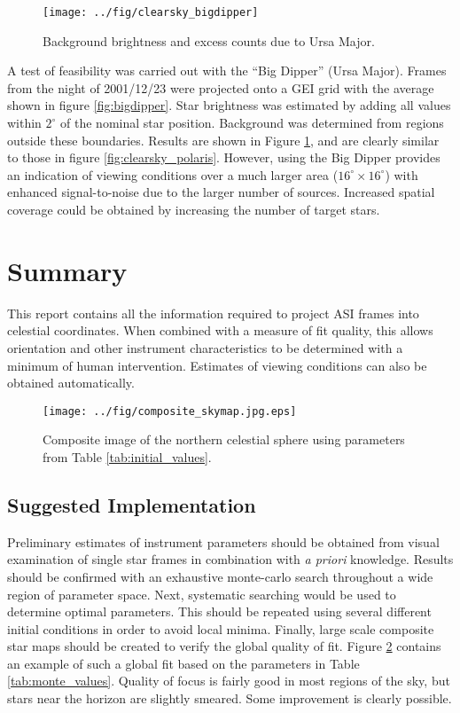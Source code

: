 \documentclass[11pt,twoside]{article}   %
\begin{document}
\begin{figure}[htb!]
  \texttt{[image: ../fig/clearsky\_bigdipper]}
    \caption[Clear sky estimates using Ursa Major]
   {Background brightness and excess counts due to
   Ursa Major.
     \label{fig:clearsky_bigdipper}  }
\end{figure}

A test of feasibility was carried out with the ``Big Dipper''
(Ursa Major). Frames from the night of 2001/12/23 were projected
onto a GEI grid with the average shown in figure
\ref{fig:bigdipper}. Star brightness was estimated by adding all
values within $2^\circ$ of the nominal star position. Background
was determined from regions outside these boundaries. Results are
shown in Figure \ref{fig:clearsky_bigdipper}, and are clearly
similar to those in figure \ref{fig:clearsky_polaris}. However,
using the Big Dipper provides an indication of viewing conditions
over a much larger area ($16^\circ \times 16^\circ$) with enhanced
signal-to-noise due to the larger number of sources. Increased
spatial coverage could be obtained by increasing the number of
target stars.

\section{Summary}
%
This report contains all the information required to project ASI
frames into celestial coordinates.  When combined with a measure
of fit quality, this allows orientation and other instrument
characteristics to be determined with a minimum of human
intervention.  Estimates of viewing conditions can also be
obtained automatically.

\begin{figure}[htb!]
  \texttt{[image: ../fig/composite\_skymap.jpg.eps]}
   \caption{Composite image of the northern celestial sphere using parameters from Table
   \ref{tab:initial_values}.
     \label{fig:composite_skymap}  }
\end{figure}

 \subsection{Suggested Implementation}
Preliminary estimates of instrument parameters should be obtained
from visual examination of single star frames in combination with
{\it a priori} knowledge.  Results should be confirmed with an
exhaustive monte-carlo search throughout a wide region of
parameter space.  Next, systematic searching would be used to
determine optimal parameters.  This should be repeated using
several different initial conditions in order to avoid local
minima.  Finally, large scale composite star maps should be
created to verify the global quality of fit.  Figure
\ref{fig:composite_skymap} contains an example of such a global
fit based on the parameters in Table \ref{tab:monte_values}.
Quality of focus is fairly good in most regions of the sky, but
stars near the horizon are slightly smeared.  Some improvement is
clearly possible.
\end{document}
